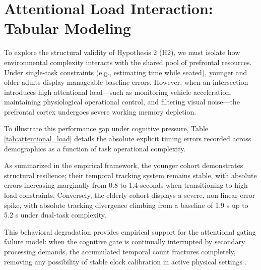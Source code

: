 \documentclass{custom_report}
\begin{document}
\section{Attentional Load Interaction: Tabular Modeling}
To explore the structural validity of Hypothesis 2 (H2), we must isolate how environmental complexity interacts with the shared pool of prefrontal resources. Under single-task constraints (e.g., estimating time while seated), younger and older adults display manageable baseline errors. However, when an intersection introduces high attentional load—such as monitoring vehicle acceleration, maintaining physiological operational control, and filtering visual noise—the prefrontal cortex undergoes severe working memory depletion.

To illustrate this performance gap under cognitive pressure, Table \ref{tab:attentional_load} details the absolute explicit timing errors recorded across demographics as a function of task operational complexity.

\begin{table}[htbp]
    \centering
    \caption{Absolute Explicit Timing Errors Across Lifespans and Attentional Load Conditions.}
    \label{tab:attentional_load}
\end{table}

As summarized in the empirical framework, the younger cohort demonstrates structural resilience; their temporal tracking system remains stable, with absolute errors increasing marginally from 0.8 to 1.4 seconds when transitioning to high-load constraints. Conversely, the elderly cohort displays a severe, non-linear error spike, with absolute tracking divergence climbing from a baseline of 1.9 s up to 5.2 s under dual-task complexity. 

This behavioral degradation provides empirical support for the attentional gating failure model: when the cognitive gate is continually interrupted by secondary processing demands, the accumulated temporal count fractures completely, removing any possibility of stable clock calibration in active physical settings \cite{Lustig2001, Bherer2007}.
\end{document}
